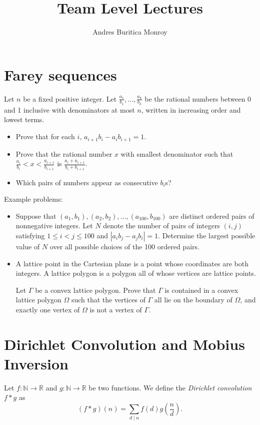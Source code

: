 \documentclass{article}
\title{Team Level Lectures}
\author{Andres Buritica Monroy}
\date{}
\begin{document}
\maketitle
\section{Farey sequences}
  Let $n$ be a fixed positive integer. Let
  $\frac{a_1}{b_1},\ldots,\frac{a_k}{b_k}$ be the rational numbers between 0
  and 1 inclusive with denominators at most $n$, written in increasing order
  and lowest terms.
  \begin{itemize}
    \item Prove that for each $i$, $a_{i+1}b_i-a_i b_{i+1}=1$.
    \item Prove that the rational number $x$ with smallest denominator such
      that $\frac{a_i}{b_i}<x<\frac{a_{i+1}}{b_{i+1}}$ is
      $\frac{a_i+a_{i+1}}{b_i+b_{i+1}}$. 
    \item Which pairs of numbers appear as consecutive $b_i$s?
  \end{itemize}

  Example problems:
  \begin{itemize}
    \item 
      Suppose that $(a_1,b_1),(a_2,b_2),\ldots,(a_{100},b_{100})$ are distinct
        ordered pairs of nonnegative integers.
        Let $N$ denote the number of pairs of integers $(i,j)$ satisfying
        $1\leq i<j\leq 100$ and $|a_i b_j-a_j b_i|=1$. 
        Determine the largest possible value of $N$ over all possible choices of the
        100 ordered pairs.
    \item A lattice point in the Cartesian plane is a point whose coordinates
      are both integers. A lattice polygon is a polygon all of whose vertices
      are lattice points.

      Let $\Gamma$ be a convex lattice polygon. Prove that $\Gamma$ is contained
      in a convex lattice polygon $\Omega$ such that the vertices of $\Gamma$
      all lie on the boundary of $\Omega$, and exactly one vertex of $\Omega$ is
      not a vertex of $\Gamma$.
  \end{itemize}
\section{Dirichlet Convolution and Mobius Inversion}
  Let $f:\mathbb N\to\mathbb R$ and $g:\mathbb N\to\mathbb R$ be two functions.
  We define the \emph{Dirichlet convolution} $f*g$ as
  \[(f*g)(n)=\sum_{d\mid n}f(d)g\left(\frac nd\right).\]
\end{document}
